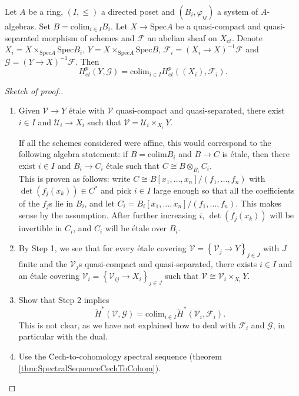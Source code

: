 \begin{theorem} \label{thm:directedColimitsAndCohomology}
Let $A$ be a ring, $(I, \leq)$ a directed poset and $(B_i, \varphi_{ij})$ a 
system of $A$-algebras. Set $B=\text{colim}_{i\in I} B_i$. Let $X \to 
\text{Spec} A$ be a quasi-compact and quasi-separated morphism of schemes and 
$\mathcal{F}$ an abelian sheaf on $X_{et}$. Denote $X_i = X\times_{\text{Spec} 
A} \text{Spec} B_i$,  $Y= X \times_{\text{Spec} A}\text{Spec} B$, 
$\mathcal{F}_i = (X_i\to X)^{-1}\mathcal{F}$ and $\mathcal{G} = (Y\to 
X)^{-1}\mathcal{F}$. Then
$$
H_{et}^p(Y, \mathcal{G}) = \text{colim}_{i\in I} H_{et}^p ((X_i), 
\mathcal{F}_i).
$$
\end{theorem}

\begin{proof}[Sketch of proof.]$ $
\begin{enumerate}
\item 
Given $\mathcal{V}\to Y$ \'etale with $\mathcal{V}$ quasi-compact and 
quasi-separated, there exist $i\in I$ and $\mathcal{U}_i \to X_i$ such that 
$\mathcal{V} = \mathcal{U}_i \times_{X_i} Y$. 
\begin{remark}
If all the schemes considered were affine, this would correspond to the 
following algebra statement: if $B=\text{colim} B_i$ and $B\to C$ is \'etale, 
then there exist $i\in I$ and $B_i\to C_i$ \'etale such that $C \cong B 
\otimes_{B_i} C_i$. 
\\
This is proven as follows: write $C \cong B\left[x_1,\ldots, x_n\right]/(f_1, 
\ldots, f_n)$ with $\det (f_j(x_k)) \in C^*$ and pick $i\in I$ large enough so 
that all the coefficients of the $f_j$s lie in $B_i$, and let $C_i = 
B_i\left[x_1, \ldots, x_n\right]/(f_1, \dots, f_n)$. This makes sense by the 
assumption. After further increasing $i$, $\det (f_j(x_k))$ will be invertible 
in $C_i$, and $C_i$ will be \'etale over $B_i$. 
\end{remark}
\item 
By Step 1, we see that for every \'etale covering $\mathcal{V} = 
\left\{\mathcal{V}_j\to Y\right\}_{j\in J}$ with $J$ finite and the 
$\mathcal{V}_j$s quasi-compact and quasi-separated, there exists $i\in I$ and 
an \'etale covering $\mathcal{V}_i = \left\{\mathcal{V}_{ij} \to X_i 
\right\}_{j\in J}$ such that $\mathcal{V} \cong \mathcal{V}_i\times_{X_i} Y$. 
\item 
Show that Step 2 implies 
$$
\check H^*(\mathcal{V}, \mathcal{G})=\text{colim}_{i\in I}\check 
H^*(\mathcal{V}_i, \mathcal{F}_i).
$$ 
This is not clear, as we have not explained how to deal with $\mathcal{F}_i$ 
and $\mathcal{G}$, in particular with the dual.
\item 
Use the \u Cech-to-cohomology spectral sequence (theorem 
\ref{thm:SpectralSequenceCechToCohom}). 
\end{enumerate}
\end{proof}

